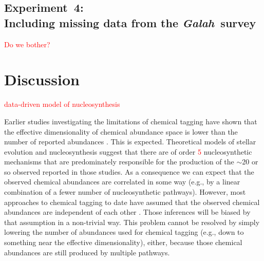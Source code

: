 \documentclass[twocolumn]{aastex62}
\newcommand{\project}[1]{\textsl{#1}}
\newcommand{\Galah}{\project{Galah}}
\newcommand{\todo}[1]{\textcolor{red}{#1}}
\begin{document}
\subsection{Experiment~4:\\Including missing data from the \Galah\ survey} \label{sec:experiment-4}

\todo{Do we bother?}

\section{Discussion} \label{sec:discussion}

\todo{data-driven model of nucleosynthesis}


Earlier studies investigating the limitations of chemical tagging have shown
that the effective dimensionality of chemical abundance space is lower than
the number of reported abundances \citep[e.g.,][]{Price-Jones:2018}. 
This is expected. Theoretical models of stellar evolution and nucleosynthesis 
suggest that there are of order \todo{5} nucleosynthetic mechanisms that are
predominately responsible for the production of the $\sim$20 or so observed 
reported in those studies. As a consequence we can expect that the observed
chemical abundances are correlated in some way (e.g., by a linear combination
of a fewer number of nucleosynthetic pathways).  However, most approaches to
chemical tagging to date have assumed that the observed chemical abundances
are independent of each other \todo{\citep[e.g.,][]{who}}. Those inferences
will be biased by that assumption in a non-trivial way. This problem cannot be
resolved by simply lowering the number of abundances used for chemical tagging (e.g.,
down to something near the effective dimensionality), either, because those
chemical abundances are still produced by multiple pathways.
\end{document}
